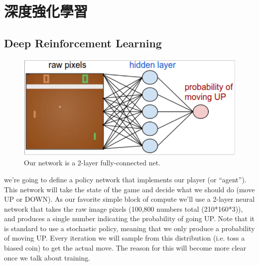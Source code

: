 \documentclass[14pt,a4paper]{report}  %
\begin{document}
\section{深度強化學習}
\subsection{Deep Reinforcement Learning}
\begin{figure}[hbt!]
\begin{center}
\includegraphics[scale=0.74]{ network}
\caption{Our network is a 2-layer fully-connected net. }%
\end{center}
\end{figure}\textbf{}

\qquad we're going to define a policy network that implements our player (or “agent”). This network will take the state of the game and decide what we should do (move UP or DOWN). As our favorite simple block of compute we'll use a 2-layer neural network that takes the raw image pixels (100,800 numbers total (210*160*3)), and produces a single number indicating the probability of going UP. Note that it is standard to use a stochastic policy, meaning that we only produce a probability of moving UP. Every iteration we will sample from this distribution (i.e. toss a biased coin) to get the actual move. The reason for this will become more clear once we talk about training.\\
\end{document}
